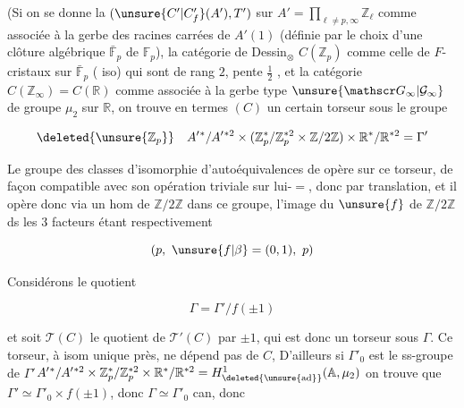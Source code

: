 
(Si on se donne la  
$(\unsure{C'|C'_f}(A'),T')$ sur $A'=\prod_{\ell\ne p,\infty}\mathbb Z_\ell$ comme
associée à la gerbe des racines carrées de $A'(1)$ (définie
par le choix d'une clôture algébrique $\bar{\mathbb F}_p$ de $\mathbb F_p$),  la
catégorie de Dessin$_\otimes$ $C(\mathbb Z_p)$ comme celle de $F$-cristaux sur $\bar{\mathbb F}_p$
( iso) qui sont de rang $2$,  pente $\frac12$ , et la 
catégorie $C(\mathbb Z_\infty)=C(\mathbb R)$ comme associée à la gerbe
type $\unsure{\mathscr G_\infty|\mathcal G_\infty}$ de groupe $\mu_2$ sur $\mathbb R$, on trouve en termes  $(C)$ un
certain torseur  sous le groupe

\[
\deleted{\unsure{\mathbb Z_p}}\quad A'{}^*/A'{}^{*2}\times
(\mathbb Z_p^*/\mathbb Z_p^{*2}\times\mathbb Z/2\mathbb Z)
\times\mathbb R^*/\mathbb R^{*2}=\Gamma'
\]

Le groupe  des classes d'isomorphie d'autoéquivalences de
 opère sur ce torseur, de façon compatible avec
son opération triviale sur lui-$=$, donc par translation,
et il opère donc via un hom  de $\mathbb Z/2\mathbb Z$ dans ce groupe,
 l'image du  $\unsure{f}$ de $\mathbb Z/2\mathbb Z$ ds les 3 facteurs
étant respectivement

\[
(p,\ \unsure{f|\beta}=(0,1),\ p)
\]


Considérons le quotient

\[
\Gamma=\Gamma'/f(\pm1)
\]

et soit $\mathcal T(C)$ le quotient de $\mathcal T'(C)$ par $\pm1$, qui
est donc un torseur sous $\Gamma$. Ce torseur, à isom unique
près, ne dépend pas de $C$,  D'ailleurs si $\Gamma'_0$ est le
ss-groupe de $\Gamma'$\quad $A'{}^*/A'{}^{*2}\times\mathbb Z_p^*/\mathbb Z_p^{*2}\times\mathbb R^*/\mathbb R^{*2}
=H^1_{\deleted{\unsure{\mathrm{ad}}}}(\mathbb A,\mu_2)$ 
on trouve que $\Gamma'\simeq\Gamma'_0\times f(\pm1)$, donc $\Gamma\simeq\Gamma'_0$ can, donc
